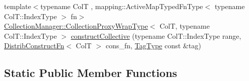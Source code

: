\begin{DoxyCompactItemize}
{\footnotesize template$<$typename ColT , mapping\+::\+Active\+Map\+Typed\+Fn\+Type$<$ typename Col\+T\+::\+Index\+Type $>$ fn$>$ }\\\hyperlink{structvt_1_1vrt_1_1collection_1_1_collection_manager_a56458ed7f9bb22b631b9b3a745f42f94}{Collection\+Manager\+::\+Collection\+Proxy\+Wrap\+Type}$<$ ColT, typename Col\+T\+::\+Index\+Type $>$ \hyperlink{structvt_1_1vrt_1_1collection_1_1_collection_manager_a9b376e8e7145bf3d0f6b268d7974f783}{construct\+Collective} (typename Col\+T\+::\+Index\+Type range, \hyperlink{structvt_1_1vrt_1_1collection_1_1_collection_manager_a7503830bc133013d542856fa39834dcc}{Distrib\+Construct\+Fn}$<$ ColT $>$ cons\+\_\+fn, \hyperlink{namespacevt_a84ab281dae04a52a4b243d6bf62d0e52}{Tag\+Type} const \&tag)
\end{DoxyCompactItemize}
\subsection*{Static Public Member Functions}
